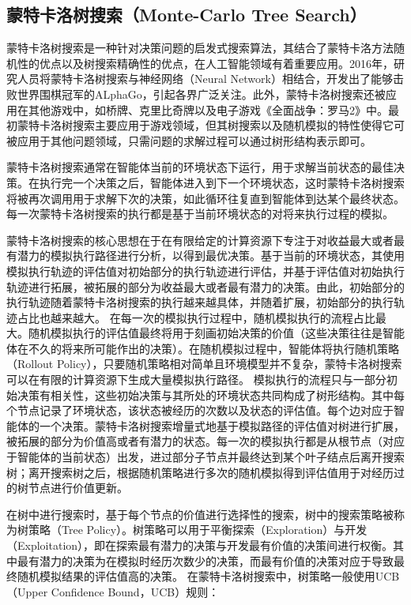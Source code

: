 \subsection{蒙特卡洛树搜索（Monte-Carlo Tree Search）}
蒙特卡洛树搜索是一种针对决策问题的启发式搜索算法\cite{DBLP:conf/aiide/ChaslotBSS08,chaslot2006monte,DBLP:conf/ecml/KocsisS06}，其结合了蒙特卡洛方法随机性的优点以及树搜索精确性的优点，在人工智能领域有着重要应用。2016年，研究人员将蒙特卡洛树搜索与神经网络（Neural Network）相结合，开发出了能够击败世界围棋冠军的ALphaGo\cite{DBLP:journals/nature/SilverHMGSDSAPL16}，引起各界广泛关注。此外，蒙特卡洛树搜索还被应用在其他游戏中，如桥牌、克里比奇牌以及电子游戏《全面战争：罗马2》中。最初蒙特卡洛树搜索主要应用于游戏领域，但其树搜索以及随机模拟的特性使得它可被应用于其他问题领域，只需问题的求解过程可以通过树形结构表示即可。

蒙特卡洛树搜索通常在智能体当前的环境状态下运行，用于求解当前状态的最佳决策。在执行完一个决策之后，智能体进入到下一个环境状态，这时蒙特卡洛树搜索将被再次调用用于求解下次的决策，如此循环往复直到智能体到达某个最终状态。每一次蒙特卡洛树搜索的执行都是基于当前环境状态的对将来执行过程的模拟。

蒙特卡洛树搜索的核心思想在于在有限给定的计算资源下专注于对收益最大或者最有潜力的模拟执行路径进行分析，以得到最优决策。基于当前的环境状态，其使用模拟执行轨迹的评估值对初始部分的执行轨迹进行评估，并基于评估值对初始执行轨迹进行拓展，被拓展的部分为收益最大或者最有潜力的决策。由此，初始部分的执行轨迹随着蒙特卡洛树搜索的执行越来越具体，并随着扩展，初始部分的执行轨迹占比也越来越大。
在每一次的模拟执行过程中，随机模拟执行的流程占比最大。随机模拟执行的评估值最终将用于刻画初始决策的价值（这些决策往往是智能体在不久的将来所可能作出的决策）。在随机模拟过程中，智能体将执行随机策略（Rollout Policy），只要随机策略相对简单且环境模型并不复杂，蒙特卡洛树搜索可以在有限的计算资源下生成大量模拟执行路径。
模拟执行的流程只与一部分初始决策有相关性，这些初始决策与其所处的环境状态共同构成了树形结构。其中每个节点记录了环境状态，该状态被经历的次数以及状态的评估值。每个边对应于智能体的一个决策。蒙特卡洛树搜索增量式地基于模拟路径的评估值对树进行扩展，被拓展的部分为价值高或者有潜力的状态。每一次的模拟执行都是从根节点（对应于智能体的当前状态）出发，进过部分子节点并最终达到某个叶子结点后离开搜索树；离开搜索树之后，根据随机策略进行多次的随机模拟得到评估值用于对经历过的树节点进行价值更新。

%
在树中进行搜索时，基于每个节点的价值进行选择性的搜索，树中的搜索策略被称为树策略（Tree Policy）。树策略可以用于平衡探索（Exploration）与开发（Exploitation），即在探索最有潜力的决策与开发最有价值的决策间进行权衡。其中最有潜力的决策为在模拟时经历次数少的决策，而最有价值的决策对应于导致最终随机模拟结果的评估值高的决策。
在蒙特卡洛树搜索中，树策略一般使用UCB（Upper Confidence Bound，UCB）\cite{DBLP:journals/ml/AuerCF02}规则：


